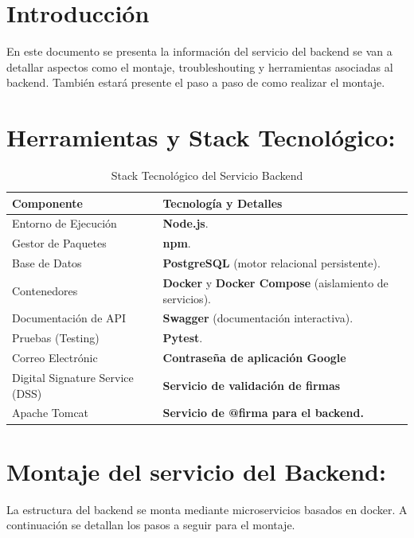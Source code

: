 \documentclass[12pt,a4paper]{report}
\begin{document}
 

\newpage
{}

\newpage
{}
\setcounter{page}{1}


\chapter{Introducción}
En este documento se presenta la información del servicio del backend se van a detallar aspectos como el montaje, troubleshouting y herramientas asociadas al backend. También estará presente el paso a paso de como realizar el montaje.
\chapter{Herramientas y Stack Tecnológico:}
\begin{table}[htbp]
    \centering
    \caption{Stack Tecnológico del Servicio Backend}
    \label{tab:stack_backend}
    \begin{tabularx}{\textwidth}{@{} l X @{}}
        \toprule
        \textbf{Componente} & \textbf{Tecnología y Detalles} \\
        \midrule
        Entorno de Ejecución & \textbf{Node.js}. \\
        Gestor de Paquetes & \textbf{npm}. \\
        Base de Datos & \textbf{PostgreSQL} (motor relacional persistente). \\
        Contenedores & \textbf{Docker} y \textbf{Docker Compose} (aislamiento de servicios). \\
        Documentación de API & \textbf{Swagger} (documentación interactiva). \\
        Pruebas (Testing) & \textbf{Pytest}. \\
        Correo Electrónic & \textbf{Contraseña de aplicación Google} \\
        Digital Signature Service (DSS) & \textbf{Servicio de validación de firmas} \\
        Apache Tomcat & \textbf{Servicio de @firma para el backend.} \\
        \bottomrule
    \end{tabularx}
\end{table}


\chapter{Montaje del servicio del Backend:}
La estructura del backend se monta mediante microservicios basados en docker. A continuación se detallan los pasos a seguir para el montaje. 
\end{document}
